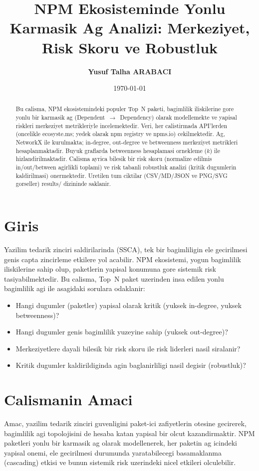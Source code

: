 \documentclass[11pt,a4paper]{article}
\title{NPM Ekosisteminde Yonlu Karmasik Ag Analizi: Merkeziyet, Risk Skoru ve Robustluk}
\author{\textbf{Yusuf Talha ARABACI}}
\date{\today}
\begin{document}
\maketitle

\begin{abstract}
Bu calisma, NPM ekosistemindeki populer Top~N paketi, bagimlilik iliskilerine gore yonlu bir karmasik ag (Dependent~$\to$~Dependency) olarak modellemekte ve yapisal riskleri merkeziyet metrikleriyle incelemektedir. Veri, her calistirmada API'lerden (oncelikle ecosyste.ms; yedek olarak npm registry ve npms.io) cekilmektedir. Ag, NetworkX ile kurulmakta; in-degree, out-degree ve betweenness merkeziyet metrikleri hesaplanmaktadir. Buyuk graflarda betweenness hesaplamasi ornekleme ($k$) ile hizlandirilmaktadir. Calisma ayrica bilesik bir risk skoru (normalize edilmis in/out/between agirlikli toplami) ve risk tabanli robustluk analizi (kritik dugumlerin kaldirilmasi) onermektedir. Uretilen tum ciktilar (CSV/MD/JSON ve PNG/SVG gorseller) results/ dizininde saklanir.
\end{abstract}

\section{Giris}
Yazilim tedarik zinciri saldirilarinda (SSCA), tek bir bagimliligin ele gecirilmesi genis capta zincirleme etkilere yol acabilir. NPM ekosistemi, yogun bagimlilik iliskilerine sahip olup, paketlerin yapisal konumuna gore sistemik risk tasiyabilmektedir. Bu calisma, Top~N paket uzerinden insa edilen yonlu bagimlilik agi ile asagidaki sorulara odaklanir:
\begin{itemize}
  \item Hangi dugumler (paketler) yapisal olarak kritik (yuksek in-degree, yuksek betweenness)?
  \item Hangi dugumler genis bagimlilik yuzeyine sahip (yuksek out-degree)?
  \item Merkeziyetlere dayali bilesik bir risk skoru ile risk liderleri nasil siralanir?
  \item Kritik dugumler kaldirildiginda agin baglanirliligi nasil degisir (robustluk)?
\end{itemize}

\section{Calismanin Amaci}
Amac, yazilim tedarik zinciri guvenligini paket-ici zafiyetlerin otesine gecirerek, bagimlilik agi topolojisini de hesaba katan yapisal bir olcut kazandirmaktir. NPM paketleri yonlu bir karmasik ag olarak modellenerek, her paketin ag icindeki yapisal onemi, ele gecirilmesi durumunda yaratabilecegi basamaklanma (cascading) etkisi ve bunun sistemik risk uzerindeki nicel etkileri olculebilir.
\end{document}
